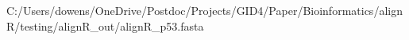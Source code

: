 \documentclass[preview]{standalone}
\begin{document}
\begin{texshade}{C:/Users/dowens/OneDrive/Postdoc/Projects/GID4/Paper/Bioinformatics/alignR/testing/alignR_out/alignR_p53.fasta}
\showlegend
\movelegend{0cm}{0cm}
\namesfootnotesize
\residuesfootnotesize
\legendfootnotesize
\numberingtiny
\end{texshade}
\end{document}
